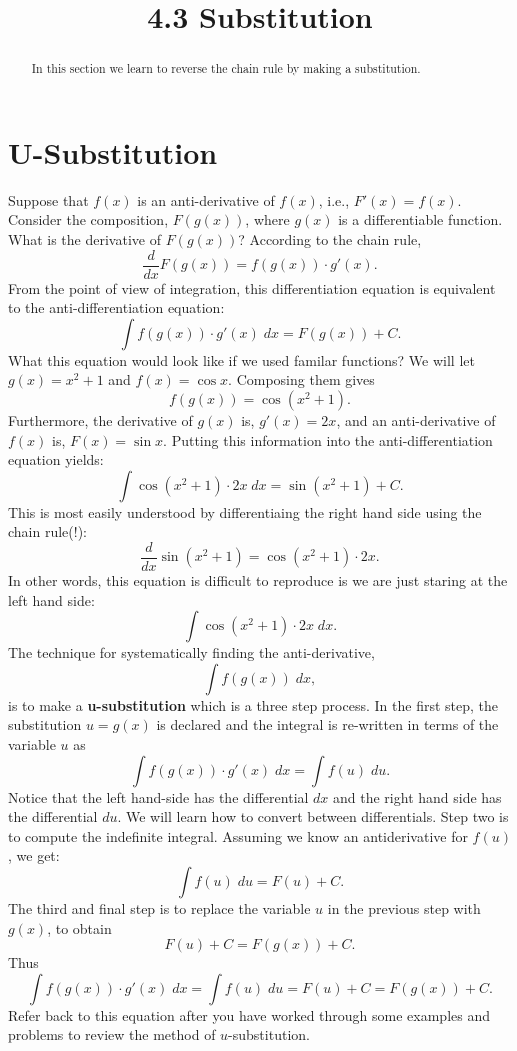 \documentclass[handout]{ximera}
\title{4.3 Substitution}
\begin{document}
\begin{abstract}
In this section we learn to reverse the chain rule by making a substitution.
\end{abstract}

\maketitle

\section{U-Substitution}

Suppose that $f(x)$ is an anti-derivative of $f(x)$, i.e., $F'(x) = f(x)$. 
Consider the composition, $F(g(x))$, where $g(x)$ is a differentiable function. What is the derivative of 
$F(g(x))$? According to the chain rule,
\[
\frac{d}{dx} F\left(g(x)\right) = f\left(g(x)\right)\cdot g'(x).
\]
From the point of view of integration, this differentiation equation 
is equivalent to the anti-differentiation equation:
\[
\int f(g(x))\cdot g'(x) \; dx = F(g(x)) + C.
\]
What this equation would look like if we used familar functions? We will 
let $g(x) = x^2 + 1$ and $f(x) = \cos x$. Composing them gives
\[
 f(g(x)) = \cos(x^2 + 1).
 \]
 Furthermore, the derivative of $g(x)$ is, $g'(x) = 2x$,
  and an anti-derivative of $f(x)$ is, $F(x) = \sin x$. 
  Putting this information into the anti-differentiation equation yields:
\[
\int \cos(x^2 + 1) \cdot 2x \; dx = \sin(x^2 + 1) + C.
\]
This is most easily understood by differentiaing the right hand side using the chain rule(!):
\[
\frac{d}{dx} \sin(x^2+1) = \cos(x^2 + 1) \cdot 2x.
\]
In other words, this equation is difficult to reproduce is we are just staring at the left hand side:
\[
\int \cos(x^2+1) \cdot 2x \; dx.
\]
The technique for systematically finding the anti-derivative,
\[
\int f(g(x)) \; dx,
\]
is to make a \textbf{u-substitution} which is a three step process.
In the first step, the substitution $u = g(x)$ is declared and the integral is re-written in terms of the variable $u$ as
\[
\int f(g(x)) \cdot g'(x) \; dx = \int f(u) \; du.
\]
Notice that the left hand-side has the differential $dx$ and the right hand side has the differential $du$.
We will learn how to convert between differentials.
Step two is to compute the indefinite integral.  Assuming we know an antiderivative for $f(u)$, we get:
\[
\int f(u) \; du = F(u) + C.
\]
The third and final step is to replace the variable $u$ in the previous step with $g(x)$, to obtain
\[
F(u) + C = F(g(x)) + C.
\]
Thus
\[
\int f(g(x)) \cdot g'(x) \; dx = \int f(u) \; du = F(u) + C = F(g(x)) + C.
\]
Refer back to this equation after you have worked through some examples and 
problems to review the method of $u$-substitution.
\end{document}
